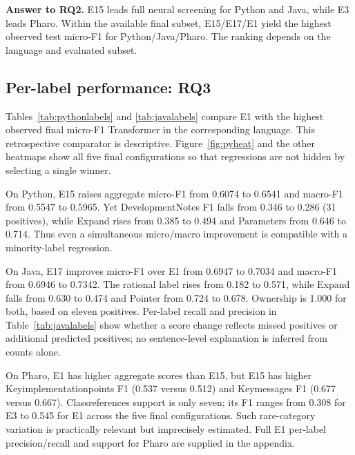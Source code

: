 \textbf{Answer to RQ2.} E15 leads full neural screening for Python and Java, while E3 leads Pharo. Within the available final subset, E15/E17/E1 yield the highest observed test micro-F1 for Python/Java/Pharo. The ranking depends on the language and evaluated subset.

\subsection{Per-label performance: RQ3}
Tables~\ref{tab:pythonlabels} and \ref{tab:javalabels} compare E1 with the highest observed final micro-F1 Transformer in the corresponding language. This retrospective comparator is descriptive. Figure~\ref{fig:pyheat} and the other heatmaps show all five final configurations so that regressions are not hidden by selecting a single winner.



On Python, E15 raises aggregate micro-F1 from 0.6074 to 0.6541 and macro-F1 from 0.5547 to 0.5965. Yet DevelopmentNotes F1 falls from 0.346 to 0.286 (31 positives), while Expand rises from 0.385 to 0.494 and Parameters from 0.646 to 0.714. Thus even a simultaneous micro/macro improvement is compatible with a minority-label regression.

On Java, E17 improves micro-F1 over E1 from 0.6947 to 0.7034 and macro-F1 from 0.6946 to 0.7342. The rational label rises from 0.182 to 0.571, while Expand falls from 0.630 to 0.474 and Pointer from 0.724 to 0.678. Ownership is 1.000 for both, based on eleven positives. Per-label recall and precision in Table~\ref{tab:javalabels} show whether a score change reflects missed positives or additional predicted positives; no sentence-level explanation is inferred from counts alone.

On Pharo, E1 has higher aggregate scores than E15, but E15 has higher Keyimplementationpoints F1 (0.537 versus 0.512) and Keymessages F1 (0.677 versus 0.667). Classreferences support is only seven; its F1 ranges from 0.308 for E3 to 0.545 for E1 across the five final configurations. Such rare-category variation is practically relevant but imprecisely estimated. Full E1 per-label precision/recall and support for Pharo are supplied in the appendix.

